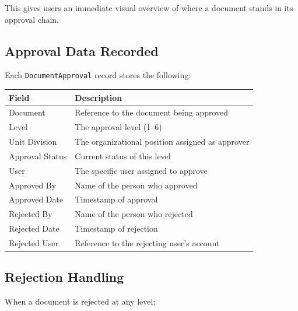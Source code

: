 This gives users an immediate visual overview of where a
document stands in its approval chain.

\subsection{Approval Data Recorded}

Each \texttt{DocumentApproval} record stores the following:

\begin{tabularx}{\textwidth}{@{} l X @{}}
  \toprule
  \textbf{Field} & \textbf{Description} \\
  \midrule
  Document
    & Reference to the document being approved \\
  Level
    & The approval level (1--6) \\
  Unit Division
    & The organizational position assigned as
      approver \\
  Approval Status
    & Current status of this level \\
  User
    & The specific user assigned to approve \\
  Approved By
    & Name of the person who approved \\
  Approved Date
    & Timestamp of approval \\
  Rejected By
    & Name of the person who rejected \\
  Rejected Date
    & Timestamp of rejection \\
  Rejected User
    & Reference to the rejecting user's account \\
  \bottomrule
\end{tabularx}

\subsection{Rejection Handling}

When a document is rejected at any level:

